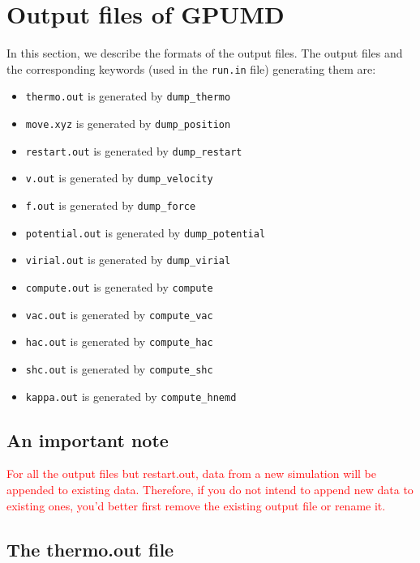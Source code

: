 \documentclass[12pt,a4paper]{report}
\begin{document}
\section{Output files of GPUMD}

In this section, we describe the formats of the output files. The output files and the corresponding keywords (used in the \verb"run.in" file) generating them are:
\begin{itemize}
\item \verb"thermo.out" is generated by \verb"dump_thermo"
\item \verb"move.xyz" is generated by \verb"dump_position"
\item \verb"restart.out" is generated by \verb"dump_restart"
\item \verb"v.out" is generated by \verb"dump_velocity"
\item \verb"f.out" is generated by \verb"dump_force"
\item \verb"potential.out" is generated by \verb"dump_potential"
\item \verb"virial.out" is generated by \verb"dump_virial"
\item \verb"compute.out" is generated by \verb"compute"
\item \verb"vac.out" is generated by \verb"compute_vac"
\item \verb"hac.out" is generated by \verb"compute_hac"
\item \verb"shc.out" is generated by \verb"compute_shc"
\item \verb"kappa.out" is generated by \verb"compute_hnemd"
\end{itemize}


\subsection{An important note}

\textcolor{red}{For all the output files but restart.out, data from a new simulation will be appended to existing data. Therefore, if you do not intend to append new data to existing ones, you'd better first remove the existing output file or rename it.}

\subsection{The thermo.out file}
\end{document}
